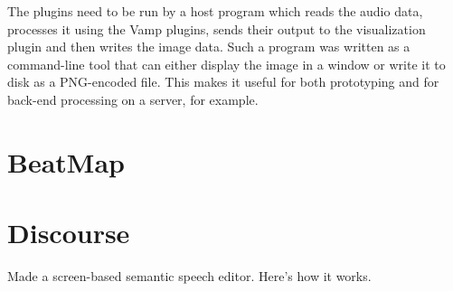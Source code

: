 The plugins need to be run by a host program which reads the audio data, processes it using the Vamp plugins, sends
their output to the visualization plugin and then writes the image data. Such a program was written as a command-line
tool that can either display the image in a window or write it to disk as a PNG-encoded file. This makes it useful for
both prototyping and for back-end processing on a server, for example.

\clearpage
\section{BeatMap}\label{sec:beatmap}

\clearpage
\section{Discourse}\label{sec:discourse}

Made a screen-based semantic speech editor. Here's how it works.
